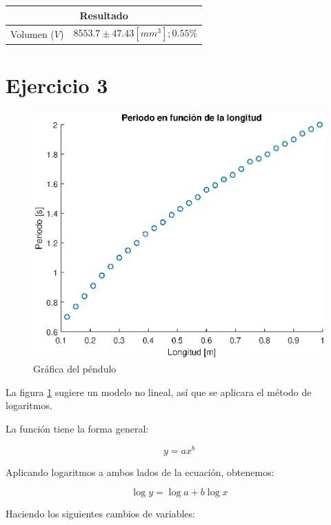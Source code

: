 \documentclass[letter,11pt]{article}
\begin{document}
\begin{center}
\begin{tabular}{|c|>{\centering}m{5.0cm}<{\centering}|}
\hline
\multicolumn{2}{|c|}{\textbf{Resultado}}
\tabularnewline \hline
Volumen ($V$) & $8553.7 \pm 47.43 [mm^3]; 0.55\%$ \tabularnewline \hline
\end{tabular}
\end{center}

\section{Ejercicio 3}
\begin{figure}[!h]
\centering
\includegraphics[scale=1.00]{eps/3.4.1.eps}
\caption{Gráfica del péndulo}
\label{practica34}
\end{figure}

La figura \ref{practica34} sugiere un modelo no lineal, así que se aplicara el
método de logaritmos.

La función tiene la forma general:

\begin{equation}
    y = a x^b
\end{equation}

Aplicando logaritmos a ambos lados de la ecuación, obtenemos:

\begin{equation*}
    \log y = \log a + b \log x
\end{equation*}

Haciendo los siguientes cambios de variables:
\end{document}
